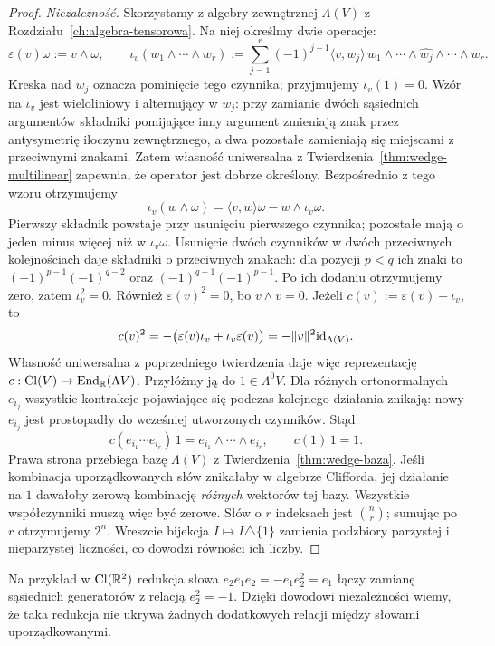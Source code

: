 \begin{proof}
\emph{Niezależność.} Skorzystamy z algebry zewnętrznej
$\Lambda(V)$ z Rozdziału~\ref{ch:algebra-tensorowa}.
Na niej określmy dwie operacje:
\[
 \varepsilon(v)\omega:=v\wedge\omega,\qquad
 \iota_v(w_1\wedge\cdots\wedge w_r)
 :=\sum_{j=1}^r(-1)^{j-1}
   \langle v,w_j\rangle\,
   w_1\wedge\cdots\wedge\widehat{w_j}
       \wedge\cdots\wedge w_r .
\]
Kreska nad $w_j$ oznacza pominięcie tego czynnika;
przyjmujemy $\iota_v(1)=0$.
Wzór na $\iota_v$ jest wieloliniowy i alternujący
w $w_j$: przy zamianie dwóch sąsiednich argumentów składniki
pomijające inny argument zmieniają znak przez antysymetrię iloczynu
zewnętrznego, a dwa pozostałe zamieniają się miejscami z przeciwnymi
znakami. Zatem własność uniwersalna
z Twierdzenia~\ref{thm:wedge-multilinear}
zapewnia, że operator jest dobrze określony.
Bezpośrednio z tego wzoru otrzymujemy
\[
 \iota_v(w\wedge\omega)
  =\langle v,w\rangle\omega-w\wedge\iota_v\omega.
\]
Pierwszy składnik powstaje przy usunięciu pierwszego
czynnika; pozostałe mają o jeden minus więcej niż
w $\iota_v\omega$. Usunięcie dwóch czynników
w dwóch przeciwnych kolejnościach daje składniki
o przeciwnych znakach: dla pozycji $p<q$ ich znaki to
$(-1)^{p-1}(-1)^{q-2}$ oraz
$(-1)^{q-1}(-1)^{p-1}$. Po ich dodaniu
otrzymujemy zero, zatem $\iota_v^2=0$.
Również $\varepsilon(v)^2=0$, bo $v\wedge v=0$.
Jeżeli $c(v):=\varepsilon(v)-\iota_v$, to
\[
 c(v)^2
 =-\bigl(\varepsilon(v)\iota_v
          +\iota_v\varepsilon(v)\bigr)
 =-\|v\|^2\mathrm{id}_{\Lambda(V)}.
\]
Własność uniwersalna z poprzedniego twierdzenia
daje więc reprezentację
$c:\operatorname{Cl}(V)\to\operatorname{End}_{\mathbb{R}}(\Lambda V)$.
Przyłóżmy ją do $1\in\Lambda^0V$.
Dla różnych ortonormalnych $e_{i_j}$ wszystkie
kontrakcje pojawiające się podczas kolejnego
działania znikają: nowy $e_{i_j}$ jest prostopadły
do wcześniej utworzonych czynników. Stąd
\[
 c(e_{i_1}\cdots e_{i_r})\,1
    =e_{i_1}\wedge\cdots\wedge e_{i_r},\qquad
 c(1)\,1=1.
\]
Prawa strona przebiega bazę $\Lambda(V)$ z
Twierdzenia~\ref{thm:wedge-baza}. Jeśli kombinacja
uporządkowanych słów znikałaby w algebrze Clifforda,
jej działanie na $1$ dawałoby zerową kombinację
\emph{różnych} wektorów tej bazy. Wszystkie
współczynniki muszą więc być zerowe.
Słów o $r$ indeksach jest $\binom nr$;
sumując po $r$ otrzymujemy $2^n$.
Wreszcie bijekcja $I\mapsto I\triangle\{1\}$
zamienia podzbiory parzystej i nieparzystej
liczności, co dowodzi równości ich liczby.
\end{proof}

Na przykład w $\operatorname{Cl}(\mathbb{R}^2)$ redukcja słowa
$e_2e_1e_2=-e_1e_2^2=e_1$ łączy zamianę sąsiednich
generatorów z relacją $e_2^2=-1$. Dzięki dowodowi
niezależności wiemy, że taka redukcja nie ukrywa
żadnych dodatkowych relacji między słowami uporządkowanymi.

